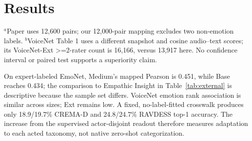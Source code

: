 \documentclass{article}
\begin{document}
\section{Results}
\begin{table}[t]
\centering\small
\caption{External human-label tests. Higher is better. The EmoNet and VoiceNet paper rows use their own full datasets or snapshots and interfaces; they are shown for orientation, not as matched-sample significance claims. Acted-corpus results use an additional nested actor-disjoint 192-score MLP adapter.}
\label{tab:external}
\vspace{2pt}\parbox{0.97\textwidth}{\footnotesize $^a$Paper uses 12,600 pairs; our 12,000-pair mapping excludes two non-emotion labels. $^b$VoiceNet Table 1 uses a different snapshot and cosine audio--text scores; its VoiceNet-Ext >=2-rater count is 16,166, versus 13,917 here. No confidence interval or paired test supports a superiority claim.}
\end{table}

On expert-labeled EmoNet, Medium's mapped Pearson is 0.451, while Base reaches 0.434; the comparison to Empathic Insight in Table~\ref{tab:external} is descriptive because the sample set differs. VoiceNet emotion rank association is similar across sizes; Ext remains low. A fixed, no-label-fitted crosswalk produces only 18.9/19.7\% CREMA-D and 24.8/24.7\% RAVDESS top-1 accuracy. The increase from the supervised actor-disjoint readout therefore measures adaptation to each acted taxonomy, not native zero-shot categorization.
\end{document}
